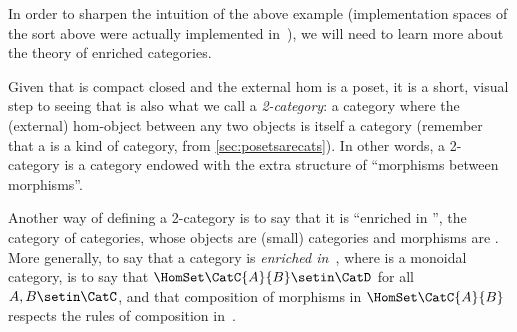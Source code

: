 In order to sharpen the intuition of the above example (implementation spaces of the sort above were actually implemented in~\cite{censi}), we will need to learn more about the theory of enriched categories.

Given that \DP is compact closed and the external hom is a poset, it is a short, visual step to seeing that \DP is also what we call a \emph{2-category}: a category where the (external) hom-object between any two objects is itself a category (remember that a  is a kind of category, from \cref{sec:posetsarecats}).
In other words, a 2-category is a category endowed with the extra structure of ``morphisms between morphisms''.

Another way of defining a 2-category is to say that it is ``enriched in \Category'', the category of categories, whose objects are (small) categories and morphisms are .
More generally, to say that a category \CatC is \emph{enriched in~\CatD}, where \CatD is a monoidal category, is to say that $\HomSet\CatC{A}{B} \setin \CatD$ for all $A,B \setin \CatC$, and that composition of morphisms in $\HomSet\CatC{A}{B}$ respects the rules of composition in~\CatD.

